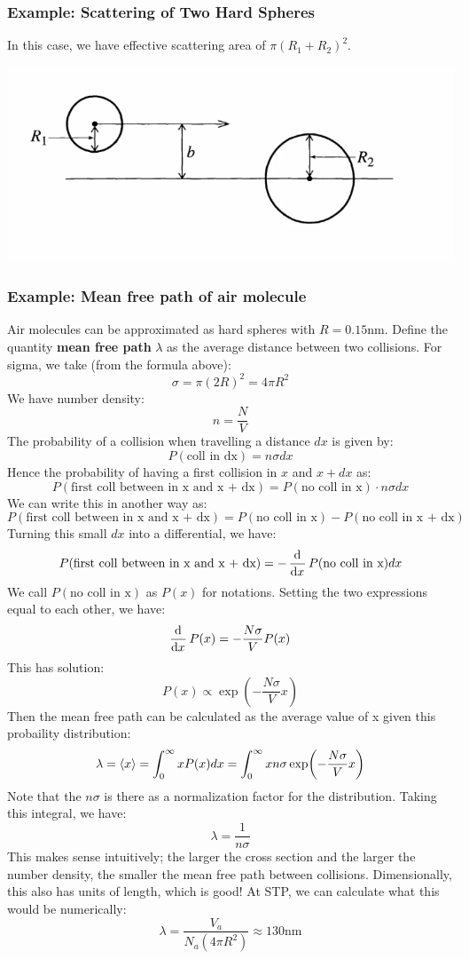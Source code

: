 \subsubsection{Example: Scattering of Two Hard Spheres}
In this case, we have effective scattering area of $\pi(R_1 + R_2)^2$.
\begin{center}
    \includegraphics[scale=0.7]{Lecture-27/l27-img6.png}
\end{center}

\subsubsection{Example: Mean free path of air molecule}
Air molecules can be approximated as hard spheres with $R = 0.15\text{nm}$. Define the quantity \textbf{mean free path} $\lambda$ as the average distance between two collisions. For sigma, we take (from the formula above):
\[\sigma = \pi(2R)^2 = 4\pi R^2\]
We have number density:
\[n = \frac{N}{V}\]
The probability of a collision when travelling a distance $dx$ is given by:
\[P(\text{coll in dx}) = n\sigma dx\]
Hence the probability of having a first collision in $x$ and $x + dx$ as:
\[P(\text{first coll between in x and x + dx}) = P(\text{no coll in x})\cdot n \sigma dx\]
We can write this in another way as:
\[P(\text{first coll between in x and x + dx}) = P(\text{no coll in x}) - P(\text{no coll in x + dx})\]
Turning this small $dx$ into a differential, we have:
\[P(\text{first coll between in x and x + dx}) = -\dod{}{x}P(\text{no coll in x})dx\]
We call $P(\text{no coll in x})$ as $P(x)$ for notations. Setting the two expressions equal to each other, we have:
\[\dod{}{x}P(x) = -\frac{N\sigma}{V}P(x)\]
This has solution:
\[P(x) \propto \exp(-\frac{N\sigma}{V}x)\]
Then the mean free path can be calculated as the average value of x given this probaility distribution:
\[\lambda = \left< x \right> = \int_{0}^{\infty}xP(x)dx = \int_0^\infty xn\sigma \exp(-\frac{N\sigma}{V}x)\]
Note that the $n\sigma$ is there as a normalization factor for the distribution. Taking this integral, we have:
\[\lambda = \frac{1}{n\sigma}\]
This makes sense intuitively; the larger the cross section and the larger the number density, the smaller the mean free path between collisions. Dimensionally, this also has units of length, which is good! At STP, we can calculate what this would be numerically:
\[\lambda = \frac{V_a}{N_a(4\pi R^2)} \approx 130\text{nm}\]

